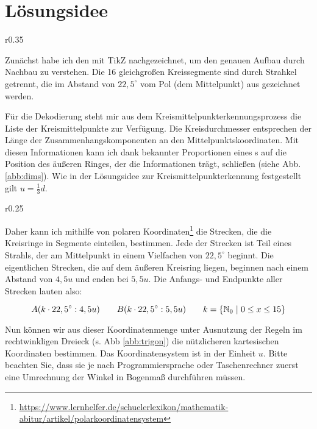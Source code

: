 \section{Lösungsidee}
\begin{wrapfigure}{r}{0.35\textwidth}
	\setlength\intextsep{0pt}
	\centering
	
	\caption{Geraden}
	\label{abb:spidergrafik}
	\vspace{-20pt}
\end{wrapfigure}
Zunächst habe ich den \task{} mit TikZ nachgezeichnet, um den genauen Aufbau durch Nachbau zu verstehen. Die 16 gleichgroßen Kreissegmente sind durch Strahkel getrennt, die im Abstand von \(22,5^{\circ}\) vom Pol (dem Mittelpunkt) aus gezeichnet werden.

Für die Dekodierung steht mir aus dem Kreismittelpunkterkennungsprozess die Liste der Kreismittelpunkte zur Verfügung. Die Kreisdurchmesser entsprechen der Länge der Zusammenhangskomponenten an den Mittelpunktskoordinaten. Mit diesen Informationen kann ich dank bekannter Proportionen eines \task{}s auf die Position des äußeren Ringes, der die Informationen trägt, schließen (siehe Abb. \ref{abb:dims}). Wie in der Lösungsidee zur Kreismittelpunkterkennung festgestellt gilt \(u=\frac{1}{3}d\).

\begin{wrapfigure}{r}{0.25\textwidth}
	\setlength\intextsep{0pt}
	\centering	
	
	\caption{}
	\label{abb:trigon}
\end{wrapfigure}
Daher kann ich mithilfe von polaren Koordinaten\footnote{\url{https://www.lernhelfer.de/schuelerlexikon/mathematik-abitur/artikel/polarkoordinatensystem}} die Strecken, die die Kreisringe in Segmente einteilen, bestimmen. Jede der Strecken ist Teil eines Strahls, der am Mittelpunkt in einem Vielfachen von \(22,5^{\circ}\) beginnt. Die eigentlichen Strecken, die auf dem äußeren Kreisring liegen, beginnen nach einem Abstand von \(4,5u\) und enden bei \(5,5u\). Die Anfangs- und Endpunkte aller Strecken lauten also:

\begin{displaymath}
A(k \cdot 22,5^{\circ}:4,5u) \hspace{2em} B(k \cdot 22,5^{\circ}:5,5u) \hspace{2em} k = \{\mathbb{N}_0 \hspace{0.3em}|\hspace{0.3em} 0 \le x \le 15\}
\end{displaymath}

Nun können wir aus dieser Koordinatenmenge unter Ausnutzung der Regeln im rechtwinkligen Dreieck (s. Abb \ref{abb:trigon}) die nützlicheren kartesischen Koordinaten bestimmen. Das Koordinatensystem ist in der Einheit \(u\). Bitte beachten Sie, dass sie je nach Programmiersprache oder Taschenrechner zuerst eine Umrechnung der Winkel in Bogenmaß durchführen müssen.

